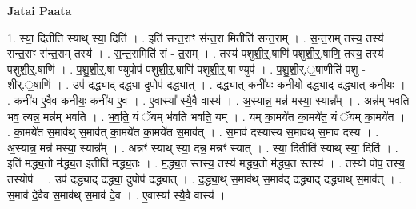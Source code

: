 \documentclass[17pt]{extarticle}
\begin{document}
\textbf{Jatai Paata} \newline

1. स्या॒ दितीति॑ स्याथ् स्या॒ दिति॑ । . इति॑ सन्त॒राꣳ स॑न्त॒रा मितीति॑ सन्त॒राम् । . स॒न्त॒राम् तस्य॒ तस्य॑ सन्त॒राꣳ स॑न्त॒राम् तस्य॑ । . स॒न्त॒रामिति॑ सं - त॒राम् । . तस्य॑ पशुशी॒र्॒.षाणि॑ पशुशी॒र्॒.षाणि॒ तस्य॒ तस्य॑ पशुशी॒र्॒.षाणि॑ । . प॒शु॒शी॒र्॒.षा ण्युपोप॑ पशुशी॒र्॒.षाणि॑ पशुशी॒र्॒.षा ण्युप॑ । . प॒शु॒शी॒र्.॒षाणीति॑ पशु - शी॒र्.॒षाणि॑ । . उप॑ दद्ध्याद् दद्ध्या॒ दुपोप॑ दद्ध्यात् । . द॒द्ध्या॒त् कनी॑यः॒ कनी॑यो दद्ध्याद् दद्ध्या॒त् कनी॑यः । . कनी॑य ए॒वैव कनी॑यः॒ कनी॑य ए॒व । . ए॒वास्या᳚ स्यै॒वै वास्य॑ । . अ॒स्यान्न॒ मन्न॑ मस्या॒ स्यान्न᳚म् । . अन्न॑म् भवति भव॒ त्यन्न॒ मन्न॑म् भवति । . भ॒व॒ति॒ यं ॅयम् भ॑वति भवति॒ यम् । . यम् का॒मये॑त का॒मये॑त॒ यं ॅयम् का॒मये॑त । . का॒मये॑त स॒माव॑थ् स॒माव॑त् का॒मये॑त का॒मये॑त स॒माव॑त् । . स॒माव॑ दस्यास्य स॒माव॑थ् स॒माव॑ दस्य । . अ॒स्यान्न॒ मन्न॑ मस्या॒ स्यान्न᳚म् । . अन्नꣳ॑ स्याथ् स्या॒ दन्न॒ मन्नꣳ॑ स्यात् । . स्या॒ दितीति॑ स्याथ् स्या॒ दिति॑ । . इति॑ मद्ध्य॒तो म॑द्ध्य॒त इतीति॑ मद्ध्य॒तः । . म॒द्ध्य॒त स्तस्य॒ तस्य॑ मद्ध्य॒तो म॑द्ध्य॒त स्तस्य॑ । . तस्यो पोप॒ तस्य॒ तस्योप॑ । . उप॑ दद्ध्याद् दद्ध्या॒ दुपोप॑ दद्ध्यात् । . द॒द्ध्या॒थ् स॒माव॑थ् स॒माव॑द् दद्ध्याद् दद्ध्याथ् स॒माव॑त् । . स॒माव॑ दे॒वैव स॒माव॑थ् स॒माव॑ दे॒व । . ए॒वास्या᳚ स्यै॒वै वास्य॑ । \newline
\end{document}
